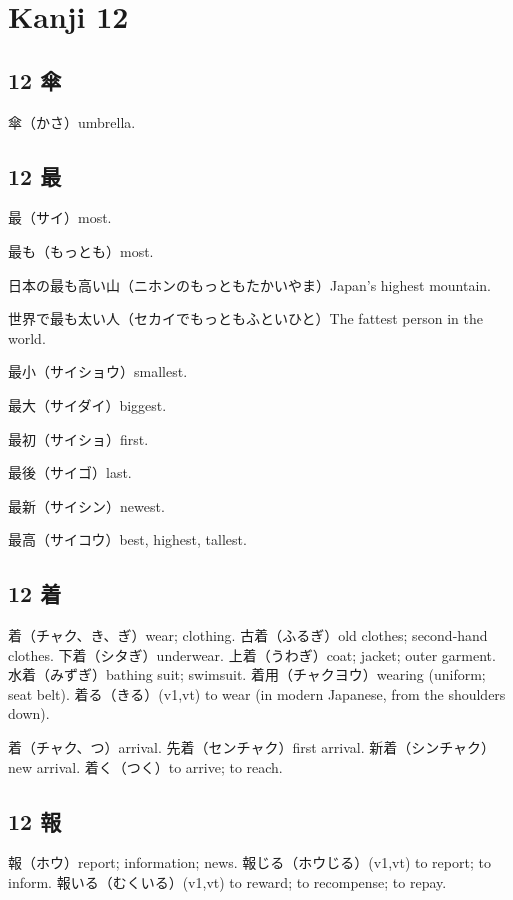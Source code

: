 \chapter{Kanji 12}

\section{12 傘}

傘（かさ）umbrella.

\section{12 最}

最（サイ）most.

最も（もっとも）most.

日本の最も高い山（ニホンのもっともたかいやま）Japan's highest mountain.

世界で最も太い人（セカイでもっともふといひと）The fattest person in the world.

最小（サイショウ）smallest.

最大（サイダイ）biggest.

最初（サイショ）first.

最後（サイゴ）last.

最新（サイシン）newest.

最高（サイコウ）best, highest, tallest.

\section{12 着}

着（チャク、き、ぎ）wear; clothing.
古着（ふるぎ）old clothes; second-hand clothes.
下着（シタぎ）underwear.
上着（うわぎ）coat; jacket; outer garment.
水着（みずぎ）bathing suit; swimsuit.
着用（チャクヨウ）wearing (uniform; seat belt).
着る（きる）(v1,vt) to wear (in modern Japanese, from the shoulders down).

着（チャク、つ）arrival.
先着（センチャク）first arrival.
新着（シンチャク）new arrival.
着く（つく）to arrive; to reach.

\section{12 報}

報（ホウ）report; information; news.
報じる（ホウじる）(v1,vt) to report; to inform.
報いる（むくいる）(v1,vt) to reward; to recompense; to repay.

